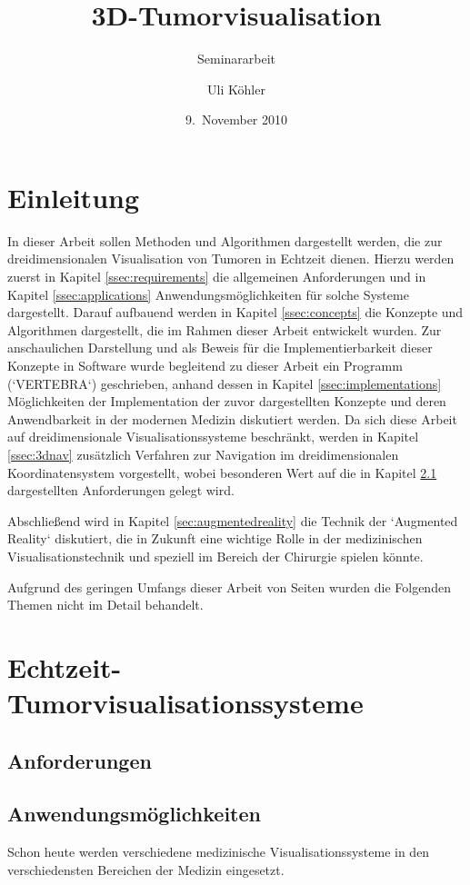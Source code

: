 \documentclass[a4paper,titlepage,12pt]{scrartcl}
\title{3D-Tumorvisualisation}
\subtitle{Seminararbeit}
\author{Uli Köhler}
\date{9.~November 2010}
\begin{document}
\maketitle\thispagestyle{empty}\newpage
\tableofcontents\thispagestyle{empty}\newpage
\section{Einleitung}\label{sec:introduction}
In dieser Arbeit sollen Methoden und Algorithmen dargestellt werden, die zur dreidimensionalen Visualisation von Tumoren in Echtzeit dienen. Hierzu werden zuerst in Kapitel \vref{ssec:requirements} die allgemeinen Anforderungen und in Kapitel \vref{ssec:applications}
Anwendungsmöglichkeiten für solche Systeme dargestellt. Darauf aufbauend werden in Kapitel \vref{ssec:concepts} die Konzepte und Algorithmen dargestellt, die im Rahmen dieser Arbeit entwickelt wurden. Zur anschaulichen Darstellung und als Beweis für die Implementierbarkeit dieser Konzepte in Software wurde begleitend zu dieser Arbeit ein Programm (`VERTEBRA`) geschrieben, anhand dessen in Kapitel \vref{ssec:implementations} Möglichkeiten der Implementation der zuvor dargestellten Konzepte und deren Anwendbarkeit in der modernen Medizin diskutiert werden. Da sich diese Arbeit auf dreidimensionale Visualisationssysteme beschränkt, werden in Kapitel \vref{ssec:3dnav} zusätzlich Verfahren zur Navigation im dreidimensionalen Koordinatensystem vorgestellt, wobei besonderen Wert auf die in Kapitel \ref{ssec:requirements} dargestellten Anforderungen gelegt wird.

Abschließend wird in Kapitel \vref{sec:augmentedreality} die Technik der `Augmented Reality` diskutiert, die in Zukunft eine wichtige Rolle in der medizinischen Visualisationstechnik und speziell im Bereich der Chirurgie spielen könnte.

Aufgrund des geringen Umfangs dieser Arbeit von \pageref{appendixstart} Seiten wurden die Folgenden Themen nicht im Detail behandelt.
\section{Echtzeit-Tumorvisualisationssysteme}\label{sec:vissystems}
\subsection{Anforderungen}\label{ssec:requirements}
\subsection{Anwendungsmöglichkeiten}\label{ssec:applications}
Schon heute werden verschiedene medizinische Visualisationssysteme in den verschiedensten Bereichen der Medizin eingesetzt. 
\end{document}
